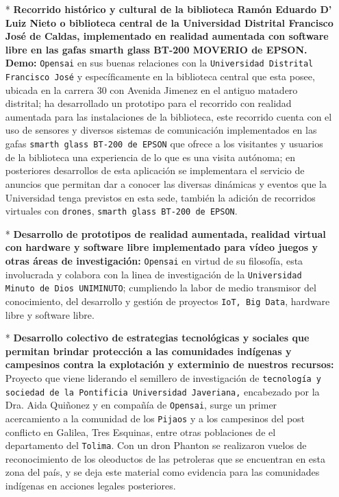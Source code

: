 \documentclass[jou]{apa6} %
\begin{document}
\begin{enumerate}
\item[*] \textbf{Recorrido histórico y cultural de la biblioteca Ramón Eduardo D' Luiz Nieto o biblioteca central de la Universidad Distrital Francisco José de Caldas, implementado en realidad aumentada con software libre en las gafas smarth glass BT-200 MOVERIO de EPSON. Demo: } \texttt{Opensai} en sus buenas relaciones con la \texttt{Universidad Distrital Francisco José} y específicamente en la biblioteca central que esta posee, ubicada en la carrera 30 con Avenida Jimenez  en el antiguo matadero distrital; ha desarrollado un prototipo para el recorrido con realidad aumentada para las instalaciones de la biblioteca, este recorrido cuenta con el uso de sensores y diversos sistemas de comunicación  implementados en las gafas \texttt{smarth glass BT-200 de EPSON} que ofrece a los visitantes y usuarios de la biblioteca una experiencia  de lo que es una visita autónoma; en posteriores desarrollos de esta aplicación se implementara el servicio de anuncios que permitan dar a conocer las diversas dinámicas y eventos que la Universidad tenga previstos en esta sede, también la adición de recorridos virtuales con \texttt{drones}, \texttt{smarth glass BT-200 de EPSON}.

\item[*] \textbf{Desarrollo de prototipos de realidad aumentada, realidad virtual con hardware y software libre implementado para vídeo juegos y otras áreas de investigación: }\texttt{Opensai} en virtud de su filosofía, esta involucrada y colabora con la linea de investigación  de la \texttt{Universidad Minuto de Dios UNIMINUTO}; cumpliendo la labor de medio transmisor del conocimiento, del desarrollo y gestión de proyectos \texttt{IoT, Big Data}, hardware libre y software libre.

\item[*] \textbf{Desarrollo colectivo de estrategias tecnológicas y sociales que permitan brindar protección a las comunidades indígenas y campesinos contra la explotación y exterminio de nuestros recursos: } Proyecto que viene liderando el semillero de investigación de \texttt{tecnología y sociedad de la Pontificia Universidad Javeriana,} encabezado por la Dra. Aida Quiñonez y en compañía de \texttt{Opensai}, surge un primer acercamiento a la comunidad de los \texttt{Pijaos} y a los campesinos del post conflicto en Galilea, Tres Esquinas, entre otras poblaciones  de el departamento del  \texttt{Tolima}. Con un dron Phanton se realizaron vuelos de reconocimiento de los oleoductos de las petroleras que se encuentran en esta zona del país, y se deja este material como evidencia para las comunidades indígenas en acciones legales posteriores.  


\end{enumerate}
\end{document}
